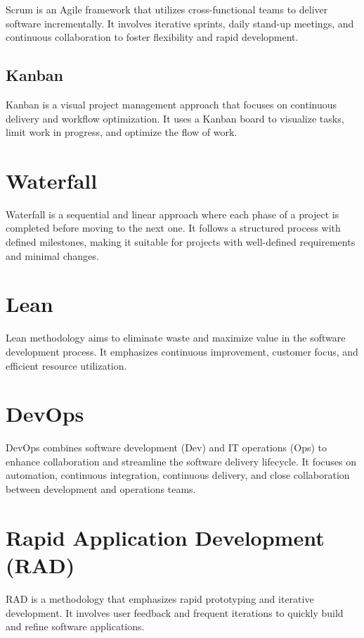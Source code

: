 Scrum is an Agile framework that utilizes cross-functional teams to deliver software incrementally. It involves iterative sprints, daily stand-up meetings, and continuous collaboration to foster flexibility and rapid development.

\subsection{Kanban}

Kanban is a visual project management approach that focuses on continuous delivery and workflow optimization. It uses a Kanban board to visualize tasks, limit work in progress, and optimize the flow of work.


\section{Waterfall}

Waterfall is a sequential and linear approach where each phase of a project is completed before moving to the next one. It follows a structured process with defined milestones, making it suitable for projects with well-defined requirements and minimal changes.




\section{Lean}

Lean methodology aims to eliminate waste and maximize value in the software development process. It emphasizes continuous improvement, customer focus, and efficient resource utilization.

\section{DevOps}

DevOps combines software development (Dev) and IT operations (Ops) to enhance collaboration and streamline the software delivery lifecycle. It focuses on automation, continuous integration, continuous delivery, and close collaboration between development and operations teams.

\section{Rapid Application Development (RAD)}

RAD is a methodology that emphasizes rapid prototyping and iterative development. It involves user feedback and frequent iterations to quickly build and refine software applications.

